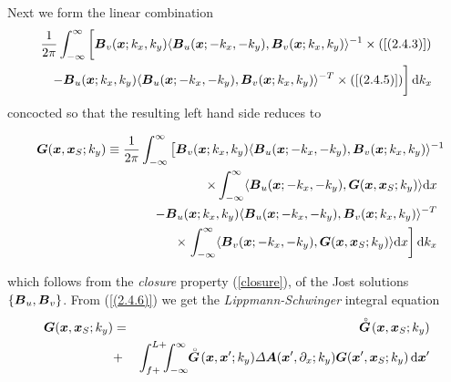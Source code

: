 Next we form the  linear combination 
\begin{eqnarray} \label{(2.4.6)}
\lefteqn{\frac{1}{2 \pi}\int_{-\infty}^{\infty} \bigg[{\bmi B}_{ v}({\bmi x};k_{x},k_{y}) \langle{  
{\bmi B}_{u}({\bmi x};-k_{x},-k_{y}),  {\bmi B}_{v}({\bmi x};k_{x},k_{y})
}\rangle^{-1}\times (\ref{(2.4.3)}) }\nonumber\\
&&- 
{\bmi B}_{ u} ({\bmi x};k_{x},k_{y}) \langle{  
{\bmi B}_{u}({\bmi x};-k_{x},-k_{y}),  
{\bmi B}_{v}({\bmi x};k_{x},k_{y})
}\rangle^{-T}\times (\ref{(2.4.5)})\bigg]\,{\rm d}k_x
\end{eqnarray}
concocted so that the resulting left hand side reduces to

\begin{samepage}
\begin{eqnarray*}
\lefteqn{{\bmi  G}({\bmi x},{\bmi x}_{S};k_y) \equiv
\frac{1}{2 \pi}\int_{-\infty}^{\infty} \left[
{\bmi B}_{ v}({\bmi x};k_{x},k_{y}) \langle{  
{\bmi B}_{u}({\bmi x};-k_{x},-k_{y}),  {\bmi B}_{v}({\bmi x};k_{x},k_{y})
}\rangle^{-1} \right.}\nonumber\\
&&\qquad\qquad\qquad\qquad\qquad\times \int_{-\infty}^{\infty} \langle{  
{\bmi B}_{u}({\bmi x};-k_{x},-k_{y}),  {\bmi  G}({\bmi x},{\bmi 
x}_{S};k_y)
}\rangle {\rm d}x \nonumber\\
&&- 
{\bmi B}_{ u} ({\bmi x};k_{x},k_{y}) \langle{  
{\bmi B}_{u}({\bmi x};-k_{x},-k_{y}),  
{\bmi B}_{v}({\bmi x};k_{x},k_{y})
}\rangle^{-T}\\
&&\qquad\qquad\qquad\qquad\qquad\times \left.
\int_{-\infty}^{\infty} \langle{ {\bmi B}_{v}({\bmi x};-k_{x},-k_{y}),  
{\bmi  G}({\bmi x},{\bmi x}_{S};k_y)}\rangle {\rm d}x\right]{\rm d}k_x\nonumber
\end{eqnarray*}
\end{samepage}
which follows from the {\em closure\/} property (\ref{closure}), of the 
Jost solutions $\{ {\mbox{\boldmath$\mit B$\unboldmath}}_{ u},{\mbox{\boldmath$\mit B$\unboldmath}}_{ v} \}$. From
(\ref{(2.4.6)}) we get the {\em Lippmann-Schwinger\/} integral equation
\begin{eqnarray} \label{LSformal}
{\mbox{\boldmath$\mit G$\unboldmath}}({\mbox{\boldmath$\mit x$\unboldmath}},{\mbox{\boldmath$\mit x$\unboldmath}}_{S};k_y)&=&
\stackrel{\scriptscriptstyle _{\,\,\circ}}{ \mbox{\boldmath$\mit G$\unboldmath}}\!({\mbox{\boldmath$\mit x$\unboldmath}},{\mbox{\boldmath$\mit x$\unboldmath}}_{S};k_y)\nonumber\\
&+&\int_{f+}^{L+}\!\!\!\int_{-\infty}^{\infty} 
\!\! \stackrel{\scriptscriptstyle _{\,\,\circ}}{ \mbox{\boldmath$\mit G$\unboldmath}}\!({\mbox{\boldmath$\mit x$\unboldmath}},{\mbox{\boldmath$\mit x$\unboldmath}}^{\prime};k_y) 
{\mit \Delta}{\mbox{\boldmath$\mit A$\unboldmath}}({\mbox{\boldmath$\mit x$\unboldmath}}^{\prime},{\partial}_{x};k_y) 
{\mbox{\boldmath$\mit G$\unboldmath}}({\mbox{\boldmath$\mit x$\unboldmath}}^{\prime},{\mbox{\boldmath$\mit x$\unboldmath}}_{S};k_y)\, {\rm d}{\mbox{\boldmath$\mit x$\unboldmath}}^{\prime}
\end{eqnarray}
